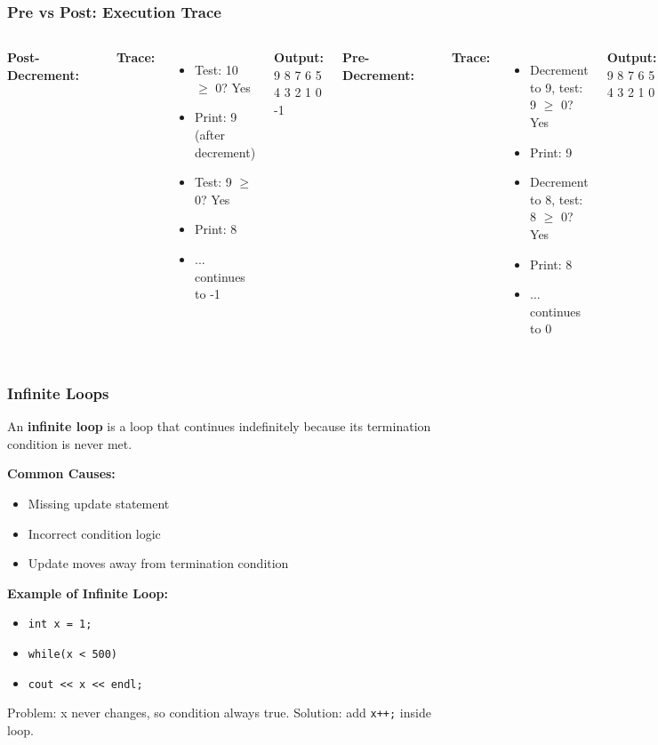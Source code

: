 \documentclass{beamer}
\begin{document}
\begin{frame}[fragile]
\frametitle{Pre vs Post: Execution Trace}
\pause
\begin{columns}[t]
\textbf{Post-Decrement:}
\begin{verbatim}
int countDown = 10;
while(countDown-- >= 0) {
    cout << countDown << '\n';
}
\end{verbatim}
\pause
\textbf{Trace:}
\begin{itemize}
\item Test: 10 $\geq$ 0? Yes
\item Print: 9 (after decrement)
\item Test: 9 $\geq$ 0? Yes
\item Print: 8
\item ... continues to -1
\end{itemize}
\textbf{Output:} 9 8 7 6 5 4 3 2 1 0 -1

\textbf{Pre-Decrement:}
\begin{verbatim}
int countDown = 10;
while(--countDown >= 0) {
    cout << countDown << '\n';
}
\end{verbatim}
\pause
\textbf{Trace:}
\begin{itemize}
\item Decrement to 9, test: 9 $\geq$ 0? Yes
\item Print: 9
\item Decrement to 8, test: 8 $\geq$ 0? Yes
\item Print: 8
\item ... continues to 0
\end{itemize}
\textbf{Output:} 9 8 7 6 5 4 3 2 1 0
\end{columns}
\end{frame}

\begin{frame}
\frametitle{Infinite Loops}
An \textbf{infinite loop} is a loop that continues indefinitely because its termination condition is never met.

\textbf{Common Causes:}
\begin{itemize}
\item Missing update statement
\pause
\item Incorrect condition logic
\pause
\item Update moves away from termination condition
\end{itemize}

\textbf{Example of Infinite Loop:}
\begin{itemize}
\item \texttt{int x = 1;}
\item \texttt{while(x < 500)}
\item \texttt{cout << x << endl;}
\end{itemize}

Problem: x never changes, so condition always true. Solution: add \texttt{x++;} inside loop.
\end{frame}
\end{document}

